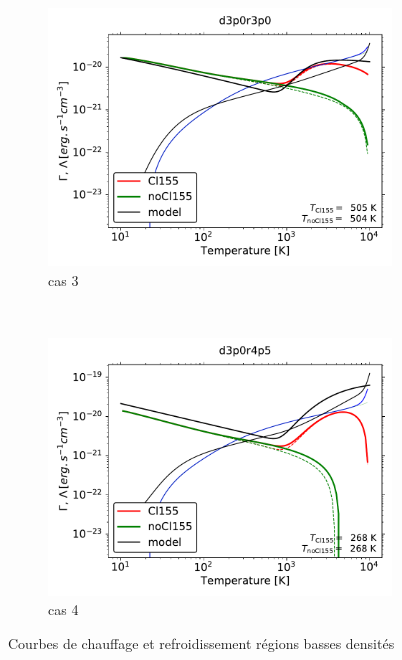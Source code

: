 \begin{figure}[!htbp]
    \centering
    \begin{subfigure}[t]{0.45\textwidth} %
        \centering \includegraphics[trim = {0 0 0 0 },clip,width=1\textwidth]{figure/Cl/particuliers/chofra3_d3p0r3p0_d3p0r3p0.pdf}
        \caption{cas 3}
    \end{subfigure}
    ~ 
    \begin{subfigure}[t]{0.45\textwidth}
        \centering \includegraphics[trim = {0 0 0 0 },clip,width=1\textwidth]{figure/Cl/particuliers/chofra3_d3p0r4p5_d3p0r4p5.pdf}
        \caption{cas 4}
    \end{subfigure}
    \caption{Courbes de chauffage et refroidissement régions basses densités}
    \label{fig:Cl:particuliers:chofra34}
\end{figure}

